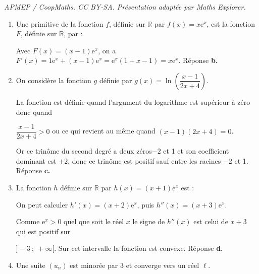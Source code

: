 \documentclass[10pt]{article}
\providecommand{\R}{\mathbb{R}}
\begin{document}
\noindent\textit{APMEP / CoopMaths. CC BY-SA. Présentation adaptée par Maths Explorer.}\par\medskip
\medskip












\medskip

\begin{enumerate}
\item Une primitive de la fonction $f$, définie sur $\R$ par $f(x) =x\text{e}^x$, est la fonction $F$, définie sur $\R$, par :






Avec $F(x) = (x - 1)\text{e}^x$, on a $F'(x) = 1\text{e}^x + (x - 1)\text{e}^x = \text{e}^x(1 + x - 1) = x\text{e}^x$. Réponse \textbf{b.}

\item On considère la fonction $g$ définie par $g(x) = \ln \left(\dfrac{x - 1}{2x+ 4}\right).$









La fonction est définie quand l'argument du logarithme est supérieur à zéro donc quand 

$\dfrac{x - 1}{2x+ 4} > 0$ ou ce qui revient au même quand $(x - 1)(2x + 4) = 0$.

Or ce trinôme du second degré a deux zéros$- 2$ et 1 et son coefficient dominant est $+ 2$, donc ce trinôme est positif sauf entre les racines $- 2$ et 1. Réponse \textbf{c.}
\item  La fonction $h$ définie sur $\R$ par $h(x)= (x + 1)\text{e}^{x}$ est :







On peut calculer $h'(x) = (x + 2)\text{e}^x$, puis $h''(x) = (x + 3)\text{e}^x$.

Comme $\text{e}^x > 0$ quel que soit le réel $x$ le signe de $h''(x)$ est celui de $x + 3$ qui est positif sur 

$]-3~;~+ \infty[$. Sur cet intervalle la fonction est convexe. Réponse \textbf{d.}

\item Une suite $\left(u_n\right)$ est minorée par 3 et converge vers un réel $\ell$.









\end{enumerate}
\end{document}
